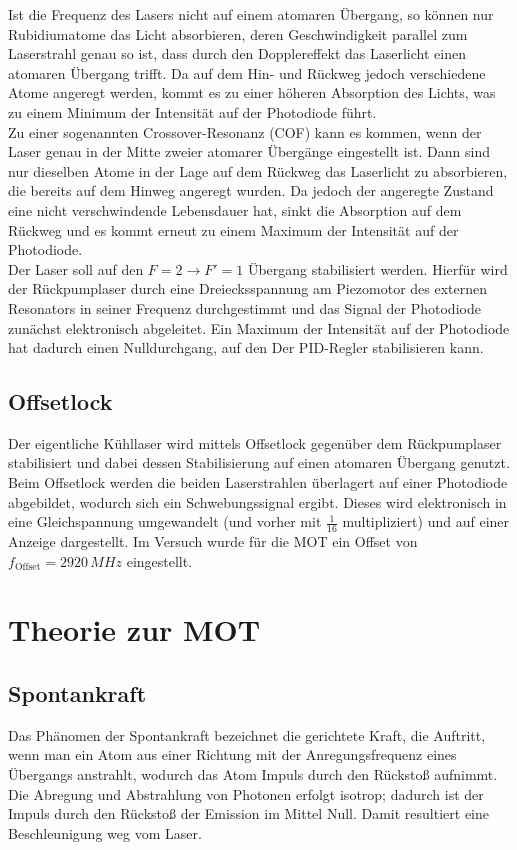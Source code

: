 \documentclass[twoside,colorback,accentcolor=tud4c,11pt]{tudreport}
\begin{document}
Ist die Frequenz des Lasers nicht auf einem atomaren Übergang, so können nur Rubidiumatome das Licht absorbieren, deren Geschwindigkeit parallel zum Laserstrahl genau so ist, dass durch den Dopplereffekt das Laserlicht einen atomaren Übergang trifft. Da auf dem Hin- und Rückweg jedoch verschiedene Atome angeregt werden, kommt es zu einer höheren Absorption des Lichts, was zu einem Minimum der Intensität auf der Photodiode führt.\\
Zu einer sogenannten Crossover-Resonanz (COF) kann es kommen, wenn der Laser genau in der Mitte zweier atomarer Übergänge eingestellt ist. Dann sind nur dieselben Atome in der Lage auf dem Rückweg das Laserlicht zu absorbieren, die bereits auf dem Hinweg angeregt wurden. Da jedoch der angeregte Zustand eine nicht verschwindende Lebensdauer hat, sinkt die Absorption auf dem Rückweg und es kommt erneut zu einem Maximum der Intensität auf der Photodiode.\\
Der Laser soll auf den $F=2\rightarrow F'=1$ Übergang stabilisiert werden. Hierfür wird der Rückpumplaser durch eine Dreiecksspannung am Piezomotor des externen Resonators in seiner Frequenz durchgestimmt und das Signal der Photodiode zunächst elektronisch abgeleitet. Ein Maximum der Intensität auf der Photodiode hat dadurch einen Nulldurchgang, auf den Der PID-Regler stabilisieren kann. 
\subsection{Offsetlock}
Der eigentliche Kühllaser wird mittels Offsetlock gegenüber dem Rückpumplaser stabilisiert und dabei dessen Stabilisierung auf einen atomaren Übergang genutzt. Beim Offsetlock werden die beiden Laserstrahlen überlagert auf einer Photodiode abgebildet, wodurch sich ein Schwebungssignal ergibt. Dieses wird elektronisch in eine Gleichspannung umgewandelt (und vorher mit $\frac{1}{16}$ multipliziert) und auf einer Anzeige dargestellt. Im Versuch wurde für die MOT ein Offset von $f_{\text{Offset}}=2920\,\si{MHz}$ eingestellt.
\section{Theorie zur MOT}\label{theorie} 
\subsection{Spontankraft}
Das Phänomen der Spontankraft bezeichnet die gerichtete Kraft, die Auftritt, wenn man ein Atom aus einer Richtung mit der Anregungsfrequenz eines Übergangs anstrahlt, wodurch das Atom Impuls durch den Rückstoß aufnimmt. Die Abregung und Abstrahlung von Photonen erfolgt isotrop; dadurch ist der Impuls durch den Rückstoß der Emission im Mittel Null. Damit resultiert eine Beschleunigung weg vom Laser.
\end{document}
